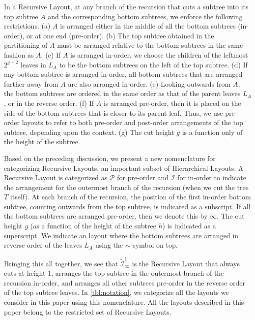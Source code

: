 \documentclass[10pt,conference,letterpaper]{IEEEtran}
\newcommand{\HLs}{Hierarchical Layouts\xspace}
\newcommand{\RL}{Recursive Layout\xspace}
\newcommand{\RLs}{Recursive Layouts\xspace}
\newcommand{\PR}{\ensuremath{\mathcal{P}}\xspace}
\newcommand{\IN}{\ensuremath{\mathcal{I}}\xspace}
\newcommand{\alt}[1]{\widetilde{#1}}
\begin{document}
In a \RL, at any branch of the recursion that cuts a subtree into its top subtree $A$ and the corresponding bottom subtrees, we enforce the following restrictions. 
(a) $A$ is arranged either in the middle of all the bottom subtrees (in-order), or at one end (pre-order). 
(b) The top subtree obtained in the partitioning of $A$ must be arranged relative to the bottom subtrees in the same fashion as $A$. (c) If $A$ is arranged in-order, we choose the children of the leftmost $2^{g-2}$ leaves in $L_A$ to be the bottom subtrees on the left of the top subtree. (d) If 
any bottom subtree is arranged in-order, 
all bottom subtrees that are arranged further away from $A$ are also arranged in-order. (e) 
Looking outwards from $A$, the bottom subtrees
are ordered in the same order as that of the parent leaves $L_A$, or in the reverse order.  
(f) If $A$ is arranged pre-order, then it is placed on the side of the bottom subtrees that is closer to its parent leaf. Thus, we 
use pre-order layouts to refer to both pre-order and post-order arrangements of the top subtree, depending upon the context. (g) The cut height $g$ is a function only of the height of the subtree.

Based on the preceding discussion, we present a new nomenclature for categorizing \RLs, an important subset of \HLs. A \RL is categorized as $\PR$ for pre-order and $\IN$ for in-order to indicate the arrangement for the outermost branch of the recursion (when we cut the tree $T$ itself). At each branch of the recursion, the position of the first in-order bottom subtree, counting outwards from the top subtree, is indicated as a subscript. If all the bottom subtrees are arranged pre-order, then we denote this by $\infty$. The cut height $g$ (as a function of the height of the subtree $h$) is indicated as a superscript. 
We indicate an layout where the bottom subtrees are arranged in reverse order of the leaves $L_A$ using the $\sim$ symbol on top.

Bringing this all together, we see that $\alt{\IN}^1_\infty$ is the \RL that always cuts at height $1$, arranges the top subtree in the outermost branch of the recursion in-order, and arranges all other subtrees pre-order in the reverse order of the top subtree leaves. In \autoref{tbl:notation}, we categorize all the layouts we consider in this paper using this nomenclature. All the layouts described in this paper belong to the restricted set of \RLs.
\end{document}
